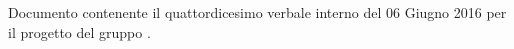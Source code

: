 Documento contenente il quattordicesimo verbale interno del 06 Giugno 2016 per il progetto \progetto{} del gruppo \gruppo{}.
